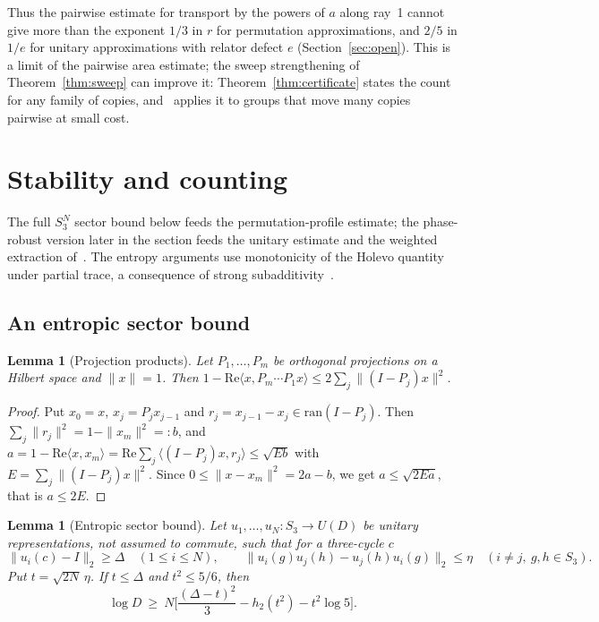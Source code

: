 \documentclass[11pt,a4paper]{article}
\theoremstyle{plain}
\newtheorem{lemma}[theorem]{Lemma}
\theoremstyle{definition}
\theoremstyle{remark}
\begin{document}
Thus the pairwise estimate for transport by the powers of $a$ along ray~1 cannot give more than the exponent $1/3$ in $r$ for permutation approximations, and $2/5$ in $1/e$ for unitary
approximations with relator defect $e$ (Section~\ref{sec:open}). This is a limit of the pairwise area estimate; the sweep strengthening of Theorem~\ref{thm:sweep} can improve it:
Theorem~\ref{thm:certificate} states the count for any family of copies, and~\cite{DouglasMghirbiC} applies it to groups that move many
copies pairwise at small cost.

\section{Stability and counting}\label{sec:profile}

The full $S_3^N$ sector bound below feeds the permutation-profile estimate; the phase-robust version later in the section
feeds the unitary estimate and the weighted extraction of~\cite{DouglasMghirbiB}. The entropy arguments use monotonicity of the Holevo quantity
under partial trace, a consequence of strong subadditivity~\cite{LiebRuskai1973}.

\subsection{An entropic sector bound}

\begin{lemma}[Projection products]\label{lem:projections}
Let $P_1,\dots,P_m$ be orthogonal projections on a Hilbert space and $\|x\|=1$. Then
$1-\mathrm{Re}\langle x,P_m\cdots P_1x\rangle\le2\sum_j\|(I-P_j)x\|^2$.
\end{lemma}

\begin{proof}
Put $x_0=x$, $x_j=P_jx_{j-1}$ and $r_j=x_{j-1}-x_j\in\mathrm{ran}(I-P_j)$. Then $\sum_j\|r_j\|^2=1-\|x_m\|^2=:b$, and
$a=1-\mathrm{Re}\langle x,x_m\rangle=\mathrm{Re}\sum_j\langle(I-P_j)x,r_j\rangle\le\sqrt{Eb}$ with $E=\sum_j\|(I-P_j)x\|^2$. Since
$0\le\|x-x_m\|^2=2a-b$, we get $a\le\sqrt{2Ea}$, that is $a\le2E$.
\end{proof}

\begin{lemma}[Entropic sector bound]\label{lem:sector}
Let $u_1,\dots,u_N:S_3\to U(D)$ be unitary representations, not assumed to commute, such that for a three-cycle $c$
\[
\|u_i(c)-I\|_2\ge\Delta\quad(1\le i\le N),\qquad\|u_i(g)u_j(h)-u_j(h)u_i(g)\|_2\le\eta\quad(i\ne j,\ g,h\in S_3).
\]
Put $t=\sqrt{2N}\,\eta$. If $t\le\Delta$ and $t^2\le5/6$, then
\[
\log D\ \ge\ N\Big[\frac{(\Delta-t)^2}3-h_2(t^2)-t^2\log5\Big].
\]
\end{lemma}
\end{document}
